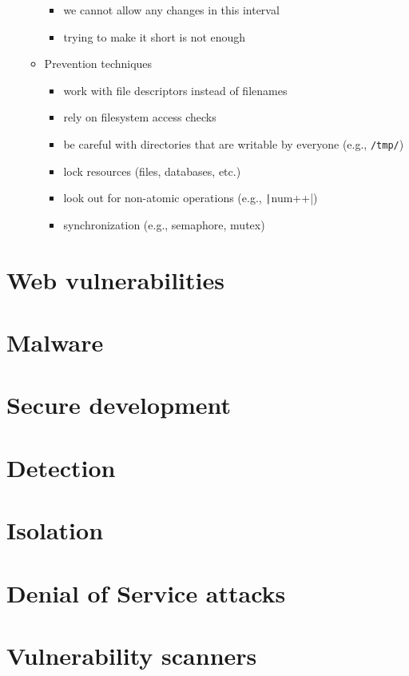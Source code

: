 \documentclass[final]{article}
\begin{document}
\begin{itemize}[nosep]
\begin{itemize}
\begin{itemize}[nosep]
                        \item we cannot allow any changes in this interval
                        \item trying to make it short is not enough
                    \end{itemize}
              \item Prevention techniques
                    \begin{itemize}[nosep]
                        \item work with file descriptors instead of filenames
                        \item rely on filesystem access checks
                        \item be careful with directories that are writable by everyone (e.g., \texttt{/tmp/})
                        \item lock resources (files, databases, etc.)
                        \item look out for non-atomic operations (e.g., \texttt|num++|)
                        \item synchronization (e.g., semaphore, mutex)
                    \end{itemize}
          \end{itemize}
\end{itemize}
\section{Web vulnerabilities}
\section{Malware}
\section{Secure development}
\section{Detection}
\section{Isolation}
\section{Denial of Service attacks}
\section{Vulnerability scanners}
\end{document}
